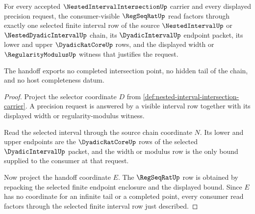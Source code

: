 \begin{theorem}
\label{thm:nested-interval-intersection-finite-diagonal-handoff}
For every accepted $\NestedIntervalIntersectionUp$ carrier and every displayed precision request, the consumer-visible $\RegSeqRatUp$ read factors through exactly one selected finite interval row of the source $\NestedIntervalUp$ or $\NestedDyadicIntervalUp$ chain, its $\DyadicIntervalUp$ endpoint packet, its lower and upper $\DyadicRatCoreUp$ rows, and the displayed width or $\RegularityModulusUp$ witness that justifies the request.

The handoff exports no completed intersection point, no hidden tail of the chain, and no host completeness datum.
\end{theorem}
\begin{proof}
Project the selector coordinate $D$ from \autoref{def:nested-interval-intersection-carrier}. A precision request is answered by a visible interval row together with its displayed width or regularity-modulus witness.

Read the selected interval through the source chain coordinate $N$. Its lower and upper endpoints are the $\DyadicRatCoreUp$ rows of the selected $\DyadicIntervalUp$ packet, and the width or modulus row is the only bound supplied to the consumer at that request.

Now project the handoff coordinate $E$. The $\RegSeqRatUp$ row is obtained by repacking the selected finite endpoint enclosure and the displayed bound. Since $E$ has no coordinate for an infinite tail or a completed point, every consumer read factors through the selected finite interval row just described.
\end{proof}


